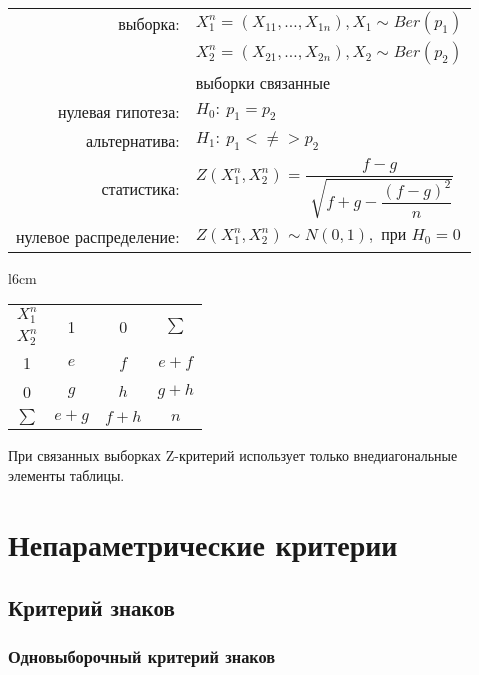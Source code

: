 \documentclass[a4paper,12pt]{article}
\begin{document}
\begin{table}[h]
	\begin{tabular}{rl}
выборка:& $ X_{1}^{n} = \left( X_{11}, \ldots, X_{1n} \right), X_{1} \sim Ber(p_{1}) $ \\
        & $ X_{2}^{n} = \left( X_{21}, \ldots, X_{2n} \right), X_{2} \sim Ber(p_{2}) $ \\
        & выборки связанные \\
нулевая гипотеза: & $ H_{0}:~ p_{1} = p_{2} $ \\
альтернатива: & $ H_{1}:~p_{1} <\neq> p_{2} $ \\
статистика: & $ Z \left( X_{1}^{n},  X_{2}^{n} \right) = \dfrac{ f - g }{ \sqrt[]{ f + g - \dfrac{(f-g)^2}{n} } } $ \\
нулевое распределение: & $ Z\left( X_{1}^{n}, X_{2}^{n} \right) \sim N(0, 1), \text{ при } H_{0} = 0 $
	\end{tabular}
\end{table}

\begin{wraptable}[3]{l}{6cm}
  \begin{tabular}{|c|c|c|c|}
    \hline
    $X_{1}^{n}$  & \multirow{2}{*}{1} & \multirow{2}{*}{0} & \multirow{2}{*}{$\sum$} \\
    $X_{2}^{n}$ & & & \\
    \hline
    1 & $e$ & $f$ & $e+f$ \\
    \hline
    0 & $g$ & $h$ & $g+h$ \\
    \hline
    $\sum$ & $e+g$ & $f+h$ & $n$ \\
    \hline
  \end{tabular}
\end{wraptable}При связанных выборках Z-критерий использует только внедиагональные элементы таблицы.

\pagebreak

\section{Непараметрические критерии}

\subsection{Критерий знаков}

\subsubsection{Одновыборочный критерий знаков}
\end{document}
